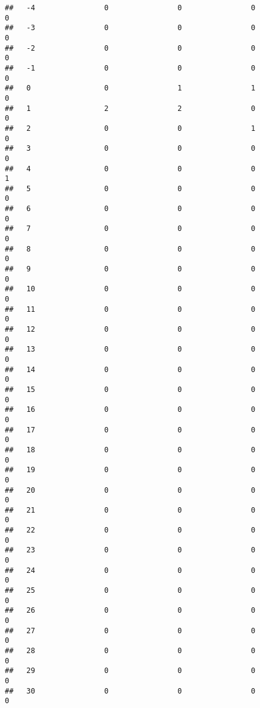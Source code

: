 \documentclass[]{article}
\begin{document}
\begin{verbatim}
##   -4                0                0                0                0
##   -3                0                0                0                0
##   -2                0                0                0                0
##   -1                0                0                0                0
##   0                 0                1                1                0
##   1                 2                2                0                0
##   2                 0                0                1                0
##   3                 0                0                0                0
##   4                 0                0                0                1
##   5                 0                0                0                0
##   6                 0                0                0                0
##   7                 0                0                0                0
##   8                 0                0                0                0
##   9                 0                0                0                0
##   10                0                0                0                0
##   11                0                0                0                0
##   12                0                0                0                0
##   13                0                0                0                0
##   14                0                0                0                0
##   15                0                0                0                0
##   16                0                0                0                0
##   17                0                0                0                0
##   18                0                0                0                0
##   19                0                0                0                0
##   20                0                0                0                0
##   21                0                0                0                0
##   22                0                0                0                0
##   23                0                0                0                0
##   24                0                0                0                0
##   25                0                0                0                0
##   26                0                0                0                0
##   27                0                0                0                0
##   28                0                0                0                0
##   29                0                0                0                0
##   30                0                0                0                0

\end{verbatim}
\end{document}

